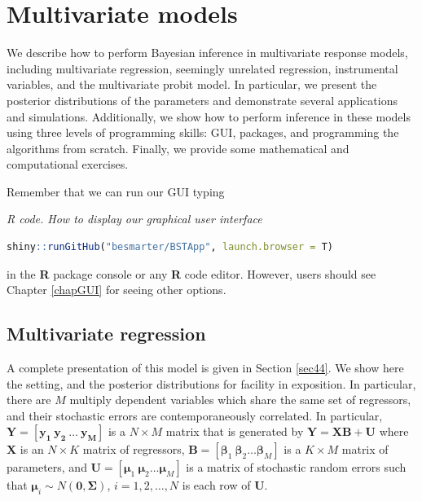 \chapter{Multivariate models}\label{chap7}

We describe how to perform Bayesian inference in multivariate response models, including multivariate regression, seemingly unrelated regression, instrumental variables, and the multivariate probit model. In particular, we present the posterior distributions of the parameters and demonstrate several applications and simulations. Additionally, we show how to perform inference in these models using three levels of programming skills: GUI, packages, and programming the algorithms from scratch. Finally, we provide some mathematical and computational exercises.

Remember that we can run our GUI typing

\begin{tcolorbox}[enhanced,width=4.67in,center upper,
	fontupper=\large\bfseries,drop shadow southwest,sharp corners]
	\textit{R code. How to display our graphical user interface}
	\begin{VF}
		\begin{lstlisting}[language=R]
	shiny::runGitHub("besmarter/BSTApp", launch.browser = T)
\end{lstlisting}
	\end{VF}
\end{tcolorbox} 

in the \textbf{R} package console or any \textbf{R} code editor. However, users should see Chapter \ref{chapGUI} for seeing other options.

\section{Multivariate regression}\label{sec71}

A complete presentation of this model is given in Section \ref{sec44}. We show here the setting, and the posterior distributions for facility in exposition. In particular, there are $M$ multiply dependent variables which share the same set of regressors, and their stochastic errors are contemporaneously correlated. In particular, $\bm{Y}=\left[{\bm{y_{1}}} \ {\bm{y_{2}}} \ \ldots \ {\bm{y_{M}}}\right]$ is a $ N\times M$ matrix that is generated by $\bm{Y}=\bm{X}\bm{B}+\bm{U}$ where $\bm{X}$ is an $ N\times K$ matrix of regressors, $\bm{B}=\left[\bm{\beta}_{1} \ \bm{\beta}_{2} \ldots \bm{\beta}_{M}\right]$ is a $ K\times M$ matrix of parameters, and $\bm{U}=\left[\bm{\mu}_{1} \ \bm{\mu}_{2}\ldots \bm{\mu}_{M}\right]$ is a matrix of stochastic random errors such that $\bm{\mu}_i\sim{N}(\bm{0},\bm{\Sigma})$, $i=1,2,\dots,N$ is each row of $\bm{U}$.

